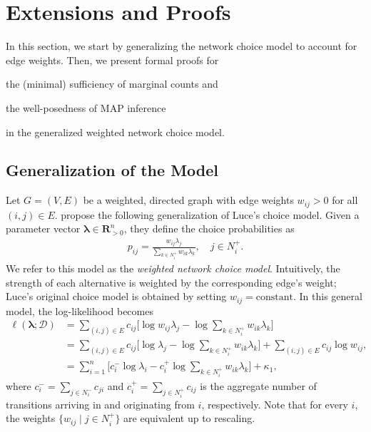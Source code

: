 \section{Extensions and Proofs}  %
\label{app:extensions}

In this section, we start by generalizing the network choice model to account for edge weights.
Then, we present formal proofs for
\begin{enuminline}
\item the (minimal) sufficiency of marginal counts and
\item the well-posedness of MAP inference
\end{enuminline}
in the generalized weighted network choice model.

\subsection{Generalization of the Model}

Let $G = (V, E)$ be a weighted, directed graph with edge weights $w_{ij} > 0$ for all $(i, j) \in E$.
\citet{kumar2015inverting} propose the following generalization of Luce's choice model.
Given a parameter vector $\bm{\lambda} \in \mathbf{R}_{>0}^n$, they define the choice probabilities as
\begin{align}
\label{eq:wsinglelik}
p_{ij} = \frac{w_{ij} \lambda_j}{\sum_{k \in N^+_i} w_{ik} \lambda_k}, \quad j \in N^+_i.
\end{align}
We refer to this model as the \emph{weighted network choice model}.
Intuitively, the strength of each alternative is weighted by the corresponding edge's weight;
Luce's original choice model is obtained by setting $w_{ij} = \text{constant}$.
In this general model, the log-likelihood becomes
\begin{align}
\ell(\bm{\lambda} ; \mathcal{D})
    &= \sum_{(i,j) \in E} c_{ij} \bigg[ \log w_{ij} \lambda_j - \log \sum_{k \in N^+_i} w_{ik} \lambda_k \bigg] \nonumber \\
    &= \sum_{(i,j) \in E} c_{ij} \bigg[ \log \lambda_j - \log \sum_{k \in N^+_i} w_{ik} \lambda_k \bigg] \nonumber
       + \sum_{(i,j) \in E} c_{ij} \log w_{ij}, \nonumber \\
    &= \sum_{i = 1}^n \bigg[ c^-_i \log \lambda_i - c^+_i \log\!\sum_{k \in N^+_i}\!w_{ik} \lambda_k \bigg] + \kappa_1, \label{eq:wloglik}
\end{align}
where $c^-_i = \sum_{j \in N^-_i} c_{ji}$ and $c^+_i = \sum_{j \in N^+_i} c_{ij}$ is the aggregate number of transitions arriving in and originating from $i$, respectively.
Note that for every $i$, the weights $\{ w_{ij} \mid j \in N^+_i \}$ are equivalent up to rescaling.

